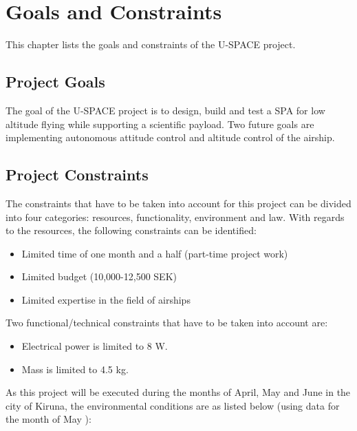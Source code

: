 \chapter{Goals and Constraints}
\label{chap:goals_constraints}

This chapter lists the goals and constraints of the \ac{U-SPACE} project. %

\section{Project Goals}

The goal of the U-SPACE project is to design, build and test a \ac{SPA} for low altitude flying while supporting a scientific payload. Two future goals are implementing autonomous attitude control and altitude control of the airship.

\section{Project Constraints}

The constraints that have to be taken into account for this project can be divided into four categories: resources, functionality, environment and law. With regards to the resources, the following constraints can be identified:

\begin{itemize}
\item Limited time of one month and a half (part-time project work)
\item Limited budget (10,000-12,500 SEK)
\item Limited expertise in the field of airships
\end{itemize}

\noindent
Two functional/technical constraints that have to be taken into account are:

\begin{itemize}
\item Electrical power is limited to 8 W.
\item Mass is limited to 4.5 kg.
\end{itemize}

\noindent
As this project will be executed during the months of April, May and June in the city of Kiruna, the environmental conditions are as listed below (using data for the month of May \cite{website:weatherspark}):

